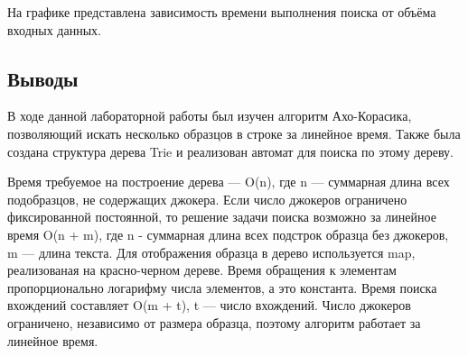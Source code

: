 \documentclass[12pt]{article}
\begin{document}
На графике представлена зависимость времени выполнения поиска от объёма входных данных.


\begin{figure}[htbp]
    \centering
    \label{fig:graph}
\end{figure}

\newpage
\subsection*{Выводы}

В ходе данной лабораторной работы был изучен алгоритм Ахо-Корасика, позволяющий искать несколько образцов в строке за линейное время. Также была создана структура дерева Trie и реализован автомат для поиска по этому дереву. 

Время требуемое на построение дерева — O(n), где n — суммарная длина всех подобразцов, не содержащих джокера. Если число джокеров ограничено фиксированной постоянной, то решение задачи поиска возможно за линейное время O(n + m), где n - суммарная длина всех подстрок образца без джокеров, m — длина текста. Для отображения образца в дерево используется map, реализованая на красно-черном дереве. Время обращения к элементам пропорционально логарифму числа элементов, а это константа. Время поиска вхождений составляет O(m + t), t — число вхождений. Число джокеров ограничено, независимо от размера образца, поэтому алгоритм работает за линейное время.
\end{document}
